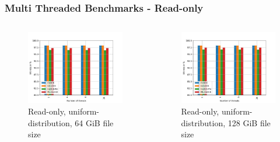 \documentclass[
	aspectratio=169,
	compress,
]{beamer}
\newcommand{\navframetitle}[1]{\frametitle{#1\hfill{\footnotesize\lastsection{}}}}
\begin{document}
\begin{frame}[fragile]
	\navframetitle{Multi Threaded Benchmarks - Read-only}

	\begin{columns}
		\begin{column}{0.5\textwidth}
			\begin{figure}[ht]
    			\centering
    			\includegraphics[width=\textwidth]{multi_64_gb_randread_uniform.jpg}
        		\caption{Read-only, uniform-distribution, 64 GiB file size}
			\end{figure}
		\end{column}
		\begin{column}{0.5\textwidth}
			\begin{figure}[ht]
    			\centering
    			\includegraphics[width=\textwidth]{multi_128_gb_randread_uniform.jpg}
        		\caption{Read-only, uniform-distribution, 128 GiB file size}
			\end{figure}			
		\end{column}
	\end{columns}
\end{frame}
\end{document}
